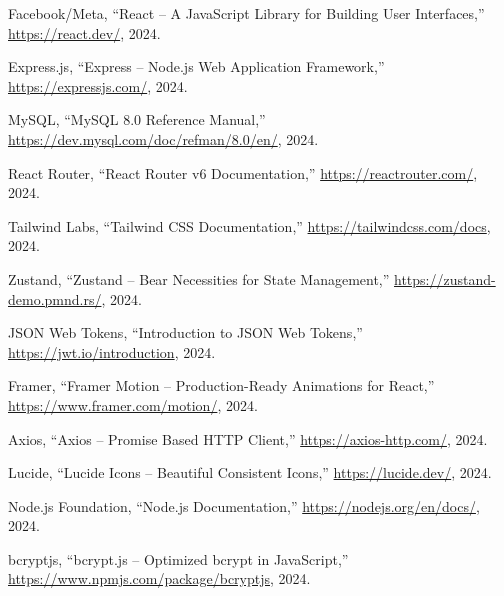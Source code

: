 \documentclass[12pt,a4paper]{report}
\begin{document}
\begin{enumerate}[label={[\arabic*]}, noitemsep]
  \item Facebook/Meta, ``React -- A JavaScript Library for Building User Interfaces,'' \url{https://react.dev/}, 2024.
  \item Express.js, ``Express -- Node.js Web Application Framework,'' \url{https://expressjs.com/}, 2024.
  \item MySQL, ``MySQL 8.0 Reference Manual,'' \url{https://dev.mysql.com/doc/refman/8.0/en/}, 2024.
  \item React Router, ``React Router v6 Documentation,'' \url{https://reactrouter.com/}, 2024.
  \item Tailwind Labs, ``Tailwind CSS Documentation,'' \url{https://tailwindcss.com/docs}, 2024.
  \item Zustand, ``Zustand -- Bear Necessities for State Management,'' \url{https://zustand-demo.pmnd.rs/}, 2024.
  \item JSON Web Tokens, ``Introduction to JSON Web Tokens,'' \url{https://jwt.io/introduction}, 2024.
  \item Framer, ``Framer Motion -- Production-Ready Animations for React,'' \url{https://www.framer.com/motion/}, 2024.
  \item Axios, ``Axios -- Promise Based HTTP Client,'' \url{https://axios-http.com/}, 2024.
  \item Lucide, ``Lucide Icons -- Beautiful Consistent Icons,'' \url{https://lucide.dev/}, 2024.
  \item Node.js Foundation, ``Node.js Documentation,'' \url{https://nodejs.org/en/docs/}, 2024.
  \item bcryptjs, ``bcrypt.js -- Optimized bcrypt in JavaScript,'' \url{https://www.npmjs.com/package/bcryptjs}, 2024.
\end{enumerate}
\end{document}
